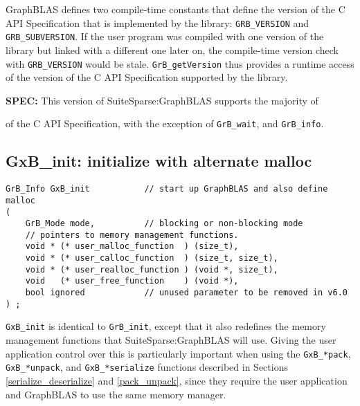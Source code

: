 \documentclass[12pt]{article}
\begin{document}
GraphBLAS defines two compile-time constants that
define the version of the C API Specification
that is implemented by the library:
\verb'GRB_VERSION' and \verb'GRB_SUBVERSION'.
If the user program was compiled with one
version of the library but linked with a different one later on, the
compile-time version check with \verb'GRB_VERSION' would be stale.
\verb'GrB_getVersion' thus provides a runtime access of the version of the C
API Specification supported by the library.

\begin{alert}
{\bf SPEC:} 
This version of SuiteSparse:GraphBLAS supports the majority of

of the C API Specification, with the exception of
\verb'GrB_wait', and \verb'GrB_info'.
\end{alert}

\subsection{{\sf GxB\_init:} initialize with alternate malloc} %
\label{xinit}

\begin{mdframed}[userdefinedwidth=6in]
{\footnotesize
\begin{verbatim}
GrB_Info GxB_init           // start up GraphBLAS and also define malloc
(
    GrB_Mode mode,          // blocking or non-blocking mode
    // pointers to memory management functions.
    void * (* user_malloc_function  ) (size_t),
    void * (* user_calloc_function  ) (size_t, size_t),
    void * (* user_realloc_function ) (void *, size_t),
    void   (* user_free_function    ) (void *),
    bool ignored            // unused parameter to be removed in v6.0
) ;
\end{verbatim}
}\end{mdframed}

\verb'GxB_init' is identical to \verb'GrB_init', except that it also redefines
the memory management functions that SuiteSparse:GraphBLAS will use.  Giving
the user application control over this is particularly important when using the
\verb'GxB_*pack',
\verb'GxB_*unpack', and \verb'GxB_*serialize' functions described in
Sections \ref{serialize_deserialize} and \ref{pack_unpack},
since they require the user application and
GraphBLAS to use the same memory manager.
\end{document}
